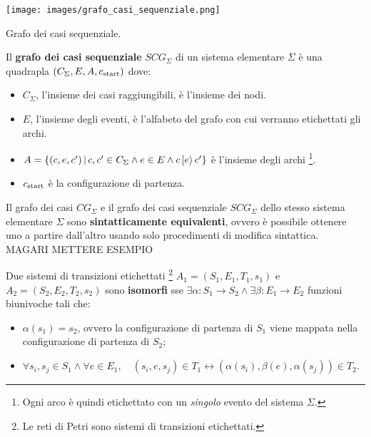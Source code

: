 \begin{marginfigure}
    \texttt{[image: images/grafo\_casi\_sequenziale.png]}
    \caption{Grafo dei casi sequenziale.}
    \label{fig:sequential_case_graph}
\end{marginfigure}

\begin{defn}
    Il \textbf{grafo dei casi sequenziale} $SCG_{\Sigma}$ di un sistema elementare $\Sigma$ è una quadrapla $(C_{\Sigma}, E, A, c_{\textnormal{start}})$ dove:
    \begin{itemize}
        \item $C_{\Sigma}$, l'insieme dei casi raggiungibili, è l'insieme dei nodi.
        \item $E$, l'insieme degli eventi, è l'alfabeto del grafo con cui verranno etichettati gli archi.
        \item $A = \left\{(c, e, c') \, | \, c, c' \in C_{\Sigma} \land e \in E \land c\,[e\rangle\,c'\right\}$ è l'insieme degli archi \footnote{Ogni arco è quindi etichettato con un \textit{singolo} evento del sistema $\Sigma$.}.
        \item $c_{\textnormal{start}}$ è la configurazione di partenza.
    \end{itemize}
\end{defn}

\begin{property}
    Il grafo dei casi $CG_{\Sigma}$ e il grafo dei casi sequenziale $SCG_{\Sigma}$ dello stesso sistema elementare $\Sigma$ sono \textbf{sintatticamente equivalenti}, ovvero è possibile ottenere uno a partire dall'altro usando solo procedimenti di modifica sintattica.\\
    MAGARI METTERE ESEMPIO
\end{property}

\begin{thm}
    Due sistemi di transizioni etichettati \footnote{Le reti di Petri sono sistemi di transizioni etichettati.} $A_1 = (S_1, E_1, T_1, s_1)$ e $A_2 = (S_2, E_2, T_2, s_2)$ sono \textbf{isomorfi} sse $\exists \alpha: S_1 \rightarrow S_2 \land \exists \beta: E_1 \rightarrow E_2$ funzioni biunivoche tali che:
    \begin{itemize}
        \item $\alpha(s_1) = s_2$, ovvero la configurazione di partenza di $S_1$ viene mappata nella configurazione di partenza di $S_2$;
        \item $\forall s_i, s_j \in S_1 \land \forall e \in E_1, \quad (s_i, e, s_j) \in T_1 \leftrightarrow (\alpha(s_i), \beta(e), \alpha(s_j)) \in T_2$.
    \end{itemize}
\end{thm}

